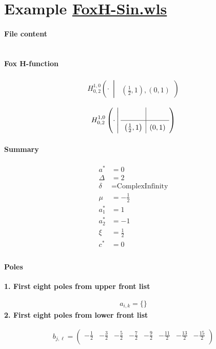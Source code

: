 \documentclass[11pt]{article}
\newcommand{\FoxH}[5]{H_{#2}^{#1}\left(#3\:\middle\vert\: \begin{array}{l}#4\\[0.4em] #5\end{array}\right)}
\begin{document}
\section{Example \url{FoxH-Sin.wls}}

\paragraph{File content}

\inputminted{text}{FoxH-Sin.wls}

\paragraph{Fox H-function}

\begin{align*}
  \FoxH
    {1,0}
    {0,2}
    {\cdot}
    {}
    {\left(\frac{1}{2}, 1\right), \left(0, 1\right)}
\end{align*}

\begin{align*}
  \FoxHext
    {1,0}
    {0,2}
    {\cdot}
    {}
    {}
    {\left(\frac{1}{2}, 1\right)}
    {\left(0, 1\right)}
\end{align*}

\paragraph{Summary}

\begin{align*}
  a^*    & = 0 \\
  \Delta & = 2 \\
  \delta & = \text{ComplexInfinity} \\
  \mu    & = -\frac{1}{2} \\
  a_1^*  & = 1 \\
  a_2^*  & = -1 \\
  \xi    & = \frac{1}{2} \\
  c^*    & = 0 \\
\end{align*}

\paragraph{Poles}

\noindent\textbf{1. First eight poles from upper front list}

\begin{align*}
  a_{i,k} = 
  \{\}
\end{align*}
\noindent\textbf{2. First eight poles from lower front list}

\begin{align*}
  b_{j,\ell} = 
  \left(
\begin{array}{cccccccc}
 -\frac{1}{2} & -\frac{3}{2} & -\frac{5}{2} & -\frac{7}{2} & -\frac{9}{2} & -\frac{11}{2} & -\frac{13}{2} & -\frac{15}{2} \\
\end{array}
\right)
\end{align*}

\printbibliography[title={References}]
\end{document}
